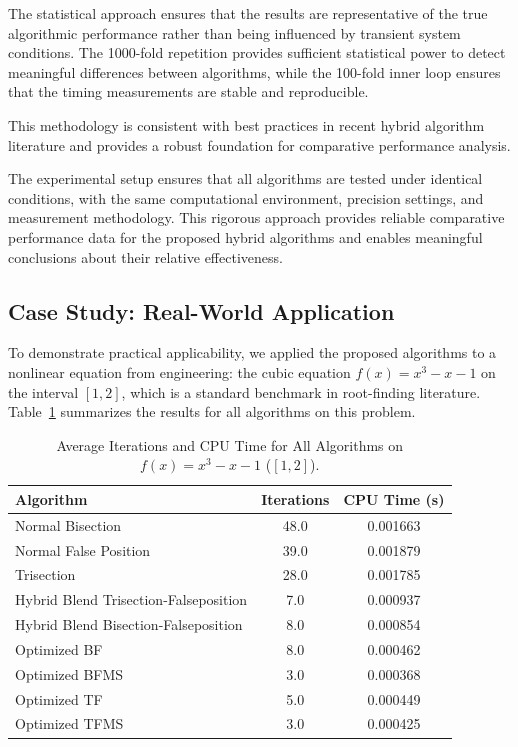 \documentclass[amsmath, amssymb, aps]{revtex4-2}
\begin{document}
The statistical approach ensures that the results are representative of the true algorithmic performance rather than being influenced by transient system conditions. The 1000-fold repetition provides sufficient statistical power to detect meaningful differences between algorithms, while the 100-fold inner loop ensures that the timing measurements are stable and reproducible.

This methodology is consistent with best practices in recent hybrid algorithm literature \cite{sabharwal2019blended, badr2022novel} and provides a robust foundation for comparative performance analysis.

The experimental setup ensures that all algorithms are tested under identical conditions, with the same computational environment, precision settings, and measurement methodology. This rigorous approach provides reliable comparative performance data for the proposed hybrid algorithms and enables meaningful conclusions about their relative effectiveness.

\subsection{Case Study: Real-World Application}
To demonstrate practical applicability, we applied the proposed algorithms to a nonlinear equation from engineering: the cubic equation $f(x) = x^3 - x - 1$ on the interval $[1, 2]$, which is a standard benchmark in root-finding literature. Table~\ref{tab:realworld} summarizes the results for all algorithms on this problem.

\begin{table}[H]
\centering
\caption{Average Iterations and CPU Time for All Algorithms on $f(x) = x^3 - x - 1$ ($[1,2]$).}
\label{tab:realworld}
\begin{tabular}{lcc}
\toprule
Algorithm & Iterations & CPU Time (s) \\
\midrule
Normal Bisection & 48.0 & 0.001663 \\
Normal False Position & 39.0 & 0.001879 \\
Trisection & 28.0 & 0.001785 \\
Hybrid Blend Trisection-Falseposition & 7.0 & 0.000937 \\
Hybrid Blend Bisection-Falseposition & 8.0 & 0.000854 \\
Optimized BF & 8.0 & 0.000462 \\
Optimized BFMS & 3.0 & 0.000368 \\
Optimized TF & 5.0 & 0.000449 \\
Optimized TFMS & 3.0 & 0.000425 \\
\bottomrule
\end{tabular}
\end{table}
\end{document}
